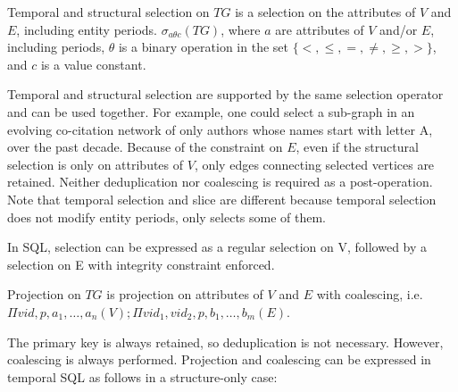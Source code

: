 \begin{definition}[Selection]
Temporal and structural selection on $TG$ is a selection on the
attributes of $V$ and $E$, including entity periods.  $\sigma_{a
  \theta c}(TG)$, where $a$ are attributes of $V$ and/or $E$,
including periods, $\theta$ is a binary operation in the set $\{<,
\leq, =, \neq, \geq, >\}$, and $c$ is a value constant.
\label{def:selection}
\end{definition}

Temporal and structural selection are supported by the same selection
operator and can be used together.  For example, one could select a
sub-graph in an evolving co-citation network of only authors whose
names start with letter A, over the past decade.  Because of the
constraint on $E$, even if the structural selection is only on
attributes of $V$, only edges connecting selected vertices are
retained.  Neither deduplication nor coalescing is required as a
post-operation.  Note that temporal selection and slice are different
because temporal selection does not modify entity periods, only
selects some of them.

In SQL, selection can be expressed as a regular selection on V, followed by a selection on E with integrity constraint enforced.

\begin{definition}[Projection]
Projection on $TG$ is projection on attributes of $V$ and $E$ with
coalescing, i.e. \\$\Pi vid, p, a_1, \ldots, a_n(V); \Pi vid_1, vid_2,
p, b_1, \ldots, b_m(E)$. 
\label{def:projection}
\end{definition}

The primary key is always retained, so deduplication is not necessary.
However, coalescing is always performed.  Projection and coalescing
can be expressed in temporal SQL as follows in a structure-only case:


